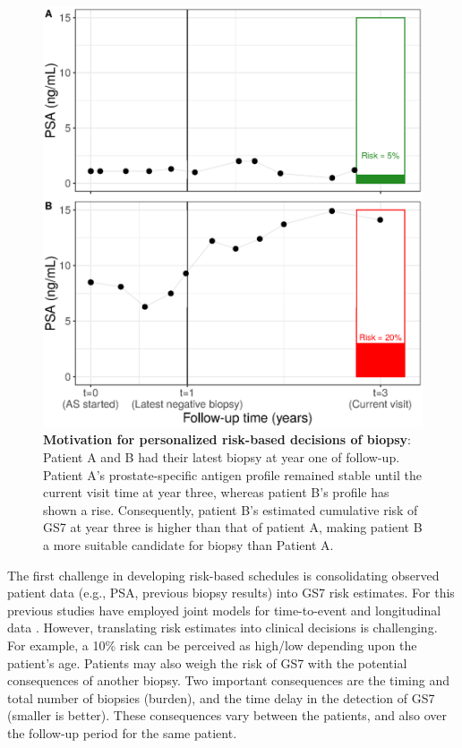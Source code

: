 \begin{figure}[!htb]
\centerline{\includegraphics[width=\columnwidth]{images/riskBasedExample.eps}}
\caption{\textbf{Motivation for personalized risk-based decisions of biopsy}: Patient A and B had their latest biopsy at year one of follow-up. Patient A's prostate-specific antigen profile remained stable until the current visit time at year three, whereas patient B's profile has shown a rise. Consequently, patient B's estimated cumulative risk of GS7 at year three is higher than that of patient A, making patient B a more suitable candidate for biopsy than Patient A.}
\label{fig:riskBasedExample}
\end{figure}

The first challenge in developing risk-based schedules is consolidating observed patient data (e.g., PSA, previous biopsy results) into GS7 risk estimates. For this previous studies have employed joint models for time-to-event and longitudinal data \citep{tomer2019,coley2017prediction,rizopoulos2012joint}. However, translating risk estimates into clinical decisions is challenging. For example, a 10\% risk can be perceived as high/low depending upon the patient's age. Patients may also weigh the risk of GS7 with the potential consequences of another biopsy. Two important consequences are the timing and total number of biopsies (burden), and the time delay in the detection of GS7 (smaller is better). These consequences vary between the patients, and also over the follow-up period for the same patient.

